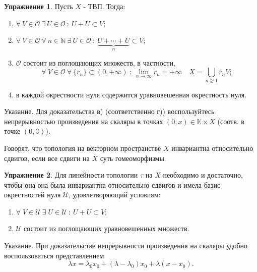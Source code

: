 \documentclass[a4paper, 12pt]{article}
\theoremstyle{definition}
\newtheorem{problem}{Упражнение}[section]
\theoremstyle{remark}
\begin{document}
\begin{problem}
    Пусть $X$ - ТВП. Тогда:
    \begin{enumerate}
        \item $\forall \ V\in \mathcal{O} \ \exists \ U\in \mathcal{O} \ : \ U + U \subset V$;
        \item $\forall \ V \in \mathcal{O} \ \forall \ n \in \mathbb{N} \ \exists \ U \in \mathcal{O} \ : \ \underbrace{U + \cdots + U}_n \subset V$;
        \item $\mathcal{O}$ состоит из поглощающих множеств, в частности,
        \[\forall \ V \in \mathcal{O} \ \forall \ \{r_n\} \subset (0, +\infty) \ : \ \lim_{n\to \infty} r_n = +\infty \quad X = \bigcup_{n\ge 1} r_n V;\]
        \item в каждой окрестности нуля содержится уравновешенная окрестность нуля.
        

    \end{enumerate}
    Указание. Для доказательства в) (соответственно г)) воспользуйтесь непрерывностью произведения на скаляры в точках $(0, x)\in \mathbb{K}\times X$ (соотв. в точке $(0, \mathbb{0})$).
\end{problem}
Говорят, что топология на векторном пространстве $X$ инвариантна относительно 
сдвигов, если все сдвиги на $X$ суть гомеоморфизмы.
\begin{problem}
    Для линейности топологии $\tau$ на $X$ необходимо и достаточно, чтобы
    она она была инвариантна относительно сдвигов и имела базис 
    окрестностей нуля $\mathcal{U}$, удовлетворяющий условиям:
    \begin{enumerate}
        \item $\forall \; V \in \mathcal U \ \exists \; U \in \mathcal U \ : \ U + U \subset V$;
        \item $\mathcal U$ состоит из поглощающих уравновешенных множеств.
    \end{enumerate}
    Указание. При доказательстве непрерывности произведения на скаляры удобно воспользоваться представлением 
    \[\lambda x = \lambda_0 x_0 + (\lambda - \lambda_0) x_0 + \lambda (x-x_0).\]
\end{problem}
\end{document}
